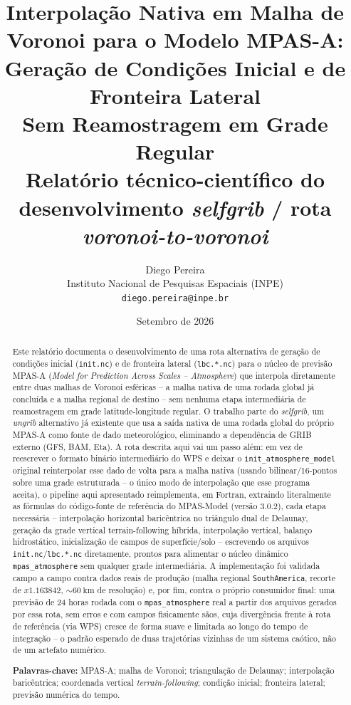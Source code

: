 \documentclass[12pt,a4paper]{report}
\title{
  \Large\textbf{Interpolação Nativa em Malha de Voronoi para o Modelo MPAS-A:\\[0.3em]
  Geração de Condições Inicial e de Fronteira Lateral\\Sem Reamostragem em Grade Regular}
  \\[1em]
  \large Relatório técnico-científico do desenvolvimento \emph{selfgrib} / rota \emph{voronoi-to-voronoi}
}
\author{Diego Pereira \\ \small Instituto Nacional de Pesquisas Espaciais (INPE) \\ \small \texttt{diego.pereira@inpe.br}}
\date{Setembro de 2026}
\newcommand{\selfgrib}{\textit{selfgrib}}
\newcommand{\mpasa}{MPAS-A}
\begin{document}
\begin{titlepage}
\maketitle
\thispagestyle{empty}
\vfill
\begin{abstract}
\noindent
Este relatório documenta o desenvolvimento de uma rota alternativa de
geração de condições inicial (\texttt{init.nc}) e de fronteira lateral
(\texttt{lbc.*.nc}) para o núcleo de previsão \mpasa{} (\textit{Model for
Prediction Across Scales -- Atmosphere}) que interpola diretamente entre
duas malhas de Voronoi esféricas -- a malha nativa de uma rodada global
já concluída e a malha regional de destino -- sem nenhuma etapa
intermediária de reamostragem em grade latitude-longitude regular.
O trabalho parte do \selfgrib{}, um \textit{ungrib} alternativo já
existente que usa a saída nativa de uma rodada global do próprio
\mpasa{} como fonte de dado meteorológico, eliminando a dependência de
GRIB externo (GFS, BAM, Eta). A rota descrita aqui vai um passo além:
em vez de reescrever o formato binário intermediário do WPS e deixar o
\texttt{init\_atmosphere\_model} original reinterpolar esse dado de volta
para a malha nativa (usando bilinear/16-pontos sobre uma grade
estruturada -- o único modo de interpolação que esse programa aceita),
o pipeline aqui apresentado reimplementa, em Fortran, extraindo
literalmente as fórmulas do código-fonte de referência do MPAS-Model
(versão 3.0.2), cada etapa necessária -- interpolação horizontal
baricêntrica no triângulo dual de Delaunay, geração da grade vertical
terrain-following híbrida, interpolação vertical, balanço hidrostático,
inicialização de campos de superfície/solo -- escrevendo os arquivos
\texttt{init.nc}/\texttt{lbc.*.nc} diretamente, prontos para alimentar o
núcleo dinâmico \texttt{mpas\_atmosphere} sem qualquer grade intermediária.
A implementação foi validada campo a campo contra dados reais de
produção (malha regional \texttt{SouthAmerica}, recorte de
$x1.163842$, $\sim\SI{60}{\kilo\metre}$ de resolução) e, por fim, contra
o próprio consumidor final: uma previsão de 24 horas rodada com o
\texttt{mpas\_atmosphere} real a partir dos arquivos gerados por essa
rota, sem erros e com campos fisicamente sãos, cuja divergência frente à
rota de referência (via WPS) cresce de forma suave e limitada ao longo do
tempo de integração -- o padrão esperado de duas trajetórias vizinhas de
um sistema caótico, não de um artefato numérico.

\vspace{1em}
\noindent\textbf{Palavras-chave:} MPAS-A; malha de Voronoi; triangulação
de Delaunay; interpolação baricêntrica; coordenada vertical
\textit{terrain-following}; condição inicial; fronteira lateral;
previsão numérica do tempo.
\end{abstract}
\vfill
\end{titlepage}
\end{document}
